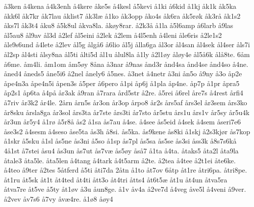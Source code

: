 {å3ken
å4kena
å4k3enh
å4kere
åke5s
å4kesl
å5kevi
å1ki
å6kid
å1kj
åk1k
åk5ka
åkk6l
åk7kr
åk7lau
åklist7
åk3læ
å1ko
åk3opp
åko4s
åk6ra
åk5røk
åk3rå
åk1s2
åks7l
åk3t4
åku8
å5k8ul
åkva8la.
åkøy8rar.
å2k3å
å1la
å5l6amp
å6larb
å9las
ål5au8
ål9av
ål3d
å2lef
ål5eini
å2lek
å2lem
å4l5enh
å4leni
åle6ris
å2le1s2
åle9s6und
å4lete
å2lev
ål5g
ålgå6
å6lio
ål5j
ålla6ga
ål3or
ål4san
ål4sek
ål4ser
åls7i
ål2sp
ål4sti
ålsy8na
ål5ti
ålti5d
ål1u
ålul8la
å1ly
å2l1øy
åløy4e
ål5å6k
ålå8te.
6åm
å6me.
åm4li.
åm1om
åm5øy
8åna
å3nar
å9nas
ånd3r
ånd4sa
ånd4se
ånd4so
å4ne.
åned4
åneds5
åne5i6
å2nel
ånely6
å5nes.
å3net
å4netr
å3ni
ån5o
å9ny
å3o
åp2e
åpe4n3a
åpe4n5i
åpen3s
å5per
å6pero
å1pi
åp6j
å1pla
åp4ne.
åp7p
å1pr
åpra5
åp2s1
åp6ta
å4på
år3ak
å9ran
å7rara
ård5str
å2re.
å5rei
å6rel
åre7s
å4rest
årfi4
å7riv
år3k2
år4le.
2årn
årn5s
år3on
år3op
årpo8
år2s
års5af
års3el
år3sem
års3ko
år8sku
årsla8ga
år3sol
års3ta
år7ste
års3ti
år7sto
år5stu
års1u
års1v
år5sy
år5u4k
år3un
år5y4
å1rø
å5r8å
ås2
å1sa
ås7au
å4se.
å4see
ås5eid
å4sek
å4sem
åseri7e6
åse3s2
å4sesm
å4seso
åse5ta
ås3h
å8si.
ås5ka.
ås9kene
ås8ki
å1skj
å2s3kjør
ås7kop
å1skr
å5sku
å1sl
ås5ne
ås3ni
å5so
å1sp
ås7pl
ås5sa
ås5se
ås3si
åss3k
å8s7s6kå
4å1st
å7stei
åsu4
ås3un
ås7ut
ås7væ
ås5øy
åså7
å1ta
å4ta.
åtaks5
åta2l
åta9la
åtale3
åta5le.
åta5len
å4tang
å4tark
å4t5arm
å2te.
å2tea
å4tee
å2t1ei
åte6ke.
å4teo
å9ter
å2tes
5åtferd
å5ti
åti7da
2åtn
å1to
åt7ov
6åtp
åt1re
åtri6pa.
åtri8pe.
åt1ru
åt5sk
åt1t
åt4ted
åt4ti
ått3o
åt4tri
åtts4
åt6t5æ
åt1u
åt4un
åtva5ra
åtva7re
åt5ve
å5ty
åt1øv
å3u
åun8ge.
å1v
åv4a
å2ve7d
å4veg
åve5l
å4veni
å9ver.
å2vev
åv7s6
å7vy
åvæ4re.
å1ø8
åøy4}
